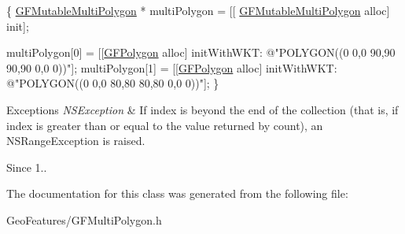 \begin{DoxyCode}
\{
   \hyperlink{interface_g_f_mutable_multi_polygon}{GFMutableMultiPolygon} * multiPolygon = [[
      \hyperlink{interface_g_f_mutable_multi_polygon}{GFMutableMultiPolygon} alloc] init];

   multiPolygon[0] = [[\hyperlink{interface_g_f_polygon}{GFPolygon} alloc] initWithWKT: \textcolor{stringliteral}{@"POLYGON((0 0,0 90,90 90,90 0,0 0))"}];
   multiPolygon[1] = [[\hyperlink{interface_g_f_polygon}{GFPolygon} alloc] initWithWKT: \textcolor{stringliteral}{@"POLYGON((0 0,0 80,80 80,80 0,0 0))"}];
\}
\end{DoxyCode}



\begin{DoxyExceptions}{Exceptions}
{\em N\+S\+Exception} & If index is beyond the end of the collection (that is, if index is greater than or equal to the value returned by count), an N\+S\+Range\+Exception is raised.\\
\hline
\end{DoxyExceptions}
\begin{DoxySince}{Since}
1.. 
\end{DoxySince}


The documentation for this class was generated from the following file\+:\begin{DoxyCompactItemize}
\item 
Geo\+Features/G\+F\+Multi\+Polygon.\+h\end{DoxyCompactItemize}
